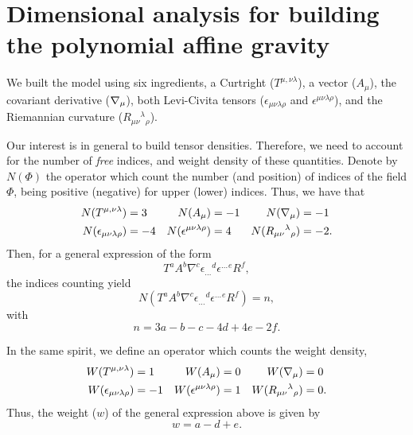 \section{\label{DA}Dimensional analysis for building the polynomial affine gravity}

We built the model using six ingredients, a Curtright ($T^{\mu,\nu\lambda}$), a vector ($A_\mu$), the covariant derivative ($\nabla_{{\mu}}$), both Levi-Civita tensors ($\epsilon_{\mu\nu\lambda\rho}$ and $\epsilon^{\mu\nu\lambda\rho}$), and the Riemannian curvature ($R_{\mu\nu}{}^\lambda{}_\rho$).

Our interest is in general to build tensor densities. Therefore, we need to account for the number of \emph{free} indices, and weight density of these quantities. Denote by $N(\Phi)$  the operator which count the number (and position) of indices of the field $\Phi$, being positive (negative) for upper (lower) indices. Thus, we have that
\begin{equation*}
  \begin{aligned}
    N( T^{\mu,\nu\lambda} ) &= 3 & N( A_\mu ) &= -1 & N(  \nabla_{{\mu}} ) &= -1 \\
    N( \epsilon_{\mu\nu\lambda\rho} ) &= -4 & N( \epsilon^{\mu\nu\lambda\rho} ) &= 4 & N( R_{\mu\nu}{}^\lambda{}_\rho ) &= -2.
  \end{aligned}
\end{equation*}
Then, for a general expression of the form
\begin{equation*}
  T^a A^b \nabla^c {\epsilon_{\dots}}^d {\epsilon^{\dots}}^e R^f,
\end{equation*}
the indices counting yield
\begin{equation}
  N( T^a A^b \nabla^c {\epsilon_{\dots}}^d {\epsilon^{\dots}}^e R^f ) = n,
\end{equation}
with
\begin{equation}
  n = 3a -b -c -4d + 4e -2f.
  \label{ni}
\end{equation}

In the same spirit, we define an operator which counts the weight density,
\begin{equation*}
  \begin{aligned}
    W( T^{\mu,\nu\lambda} ) &= 1 & W( A_\mu ) &= 0 & W(  \nabla_{{\mu}} ) &= 0 \\
    W( \epsilon_{\mu\nu\lambda\rho} ) &= -1 & W( \epsilon^{\mu\nu\lambda\rho} ) &= 1 & W( R_{\mu\nu}{}^\lambda{}_\rho ) &= 0.
  \end{aligned}
\end{equation*}
Thus, the weight ($w$) of the general expression above is given by
\begin{equation}
  w = a - d + e.
  \label{wd}
\end{equation}

